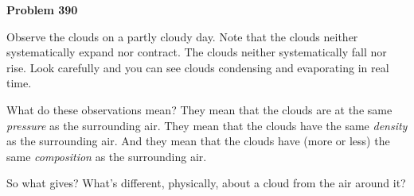 \documentclass[12pt]{article}
\begin{document}
\begin{pottproblem}
\textbf{Problem 390}

Observe the clouds on a partly cloudy day.
Note that the clouds neither systematically expand nor contract.
The clouds neither systematically fall nor rise.
Look carefully and you can see clouds condensing and evaporating in real time.

What do these observations mean?
They mean that the clouds are at the same \emph{pressure} as the surrounding air.
They mean that the clouds have the same \emph{density} as the surrounding air.
And they mean that the clouds have (more or less) the same \emph{composition} as the surrounding air.

So what gives? What's different, physically, about a cloud from the air around it?

\end{pottproblem}
\end{document}
